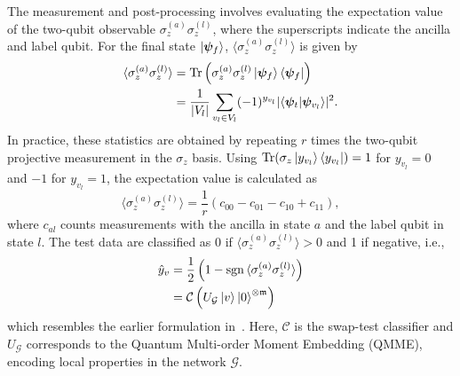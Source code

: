\documentclass[
  reprint,
  superscriptaddress,
  amsmath,amssymb,
  aps,prl,
]{revtex4-2}
\begin{document}
The measurement and post-processing involves evaluating the expectation value of the two-qubit observable \(\sigma_z^{(a)} \sigma_z^{(l)}\), where the superscripts indicate the ancilla and label qubit. For the final state \(\ket{\boldsymbol \psi_f}\), \(\langle \sigma_z^{(a)} \sigma_z^{(l)} \rangle\) is given by
\begin{align}
\langle \sigma_z^{(a)} \sigma_z^{(l)} \rangle &= \mathrm{Tr} \left( \sigma_z^{(a)} \sigma_z^{(l)} \ket{\boldsymbol \psi_f}\bra{\boldsymbol \psi_f} \right) \\
&= \frac{1}{|V_l|} \sum_{v_l \in V_l} (-1)^{y_{v_l}} |\langle \boldsymbol \psi_t |\boldsymbol \psi_{v_l}\rangle|^2.
\label{eq:expectation-values}
\end{align}
\noindent In practice, these statistics are obtained by repeating \(r\) times the two-qubit projective measurement in the \(\sigma_z\) basis. Using \(\text{Tr}(\sigma_z\ket{y_{v_l}}\bra{y_{v_l}})=1\) for \(y_{v_l}=0\) and \(-1\) for \(y_{v_l}=1\), the expectation value is calculated as 
\begin{equation}
    \langle \sigma_z^{(a)} \sigma_z^{(l)} \rangle = \frac{1}{r} \left( c_{00} - c_{01} - c_{10} + c_{11} \right),
\end{equation}
where \(c_{a l}\) counts measurements with the ancilla in state \(a\) and the label qubit in state \(l\). 
The test data are classified as 0 if \(\langle \sigma_z^{(a)} \sigma_z^{(l)} \rangle>0\) and 1 if negative, i.e.,
\begin{equation}\label{eq:test-labels-predict}
\begin{aligned}
\hat{y}_v &= \frac{1}{2} \left( 1 - \mathrm{sgn} \, \langle \sigma_z^{(a)} \sigma_z^{(l)} \rangle \right) \\
&= \mathcal{C}\left(U_\mathcal{G}\ket{v} \ket{0}^{\otimes{\mathfrak m}} \right)
\end{aligned}
\end{equation}
which resembles the earlier formulation in~. Here, \(\mathcal C\) is the swap-test classifier and \(U_\mathcal G\) corresponds to the Quantum Multi-order Moment Embedding (QMME), encoding local properties in the network \(\mathcal G\).
%
\end{document}
